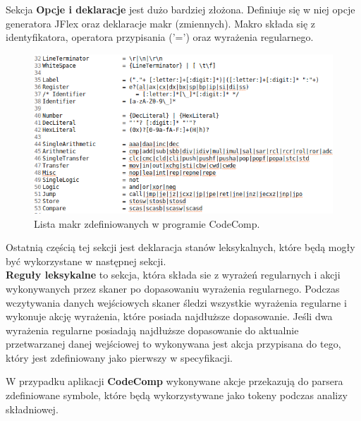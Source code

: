 \documentclass[a4paper,12pt]{article}
\begin{document}
Sekcja \textbf{Opcje i deklaracje} jest dużo bardziej złożona. Definiuje się w niej opcje generatora JFlex oraz deklaracje makr (zmiennych). Makro składa się z identyfikatora, operatora przypisania ('=') oraz wyrażenia regularnego.

\begin{figure}[here]
\centering
\includegraphics[scale=0.7]{gfx/regexp.png}
\caption{Lista makr zdefiniowanych w programie CodeComp.}
\end{figure}

Ostatnią częścią tej sekcji jest deklaracja stanów leksykalnych, które będą mogły być wykorzystane w następnej sekcji.
\\

\textbf{Reguły leksykalne} to sekcja, która składa sie z wyrażeń regularnych i akcji wykonywanych przez skaner po dopasowaniu wyrażenia regularnego. Podczas wczytywania danych wejściowych skaner śledzi wszystkie wyrażenia regularne i wykonuje akcję wyrażenia, które posiada najdłuższe dopasowanie. Jeśli dwa wyrażenia regularne posiadają najdłuższe dopasowanie do aktualnie przetwarzanej danej wejściowej to wykonywana jest akcja przypisana do tego, który jest zdefiniowany jako pierwszy w specyfikacji.

W przypadku aplikacji \textbf{CodeComp} wykonywane akcje przekazują do parsera zdefiniowane symbole, które będą wykorzystywane jako tokeny podczas analizy składniowej.
\end{document}
